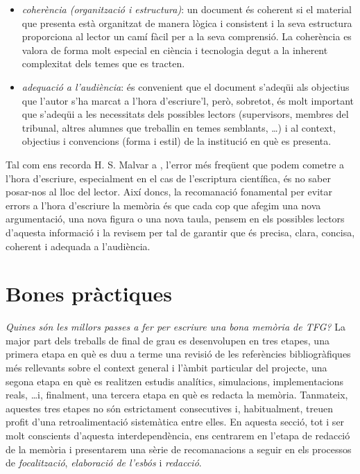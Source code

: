 \begin{itemize}
   \item \emph{coherència (organització i estructura)}: un document és coherent si el material que presenta està organitzat de manera lògica i consistent i la seva estructura proporciona al lector un camí fàcil per a la seva comprensió. La coherència es valora de forma molt especial en ciència i tecnologia degut a la inherent complexitat dels temes que es tracten.


   \item \emph{adequació a l'audiència}: és convenient que el document s'adeqüi als objectius que l'autor s'ha marcat a l'hora d'escriure'l, però, sobretot, és molt important que s'adeqüi a les necessitats dels possibles lectors (supervisors, membres del tribunal, altres alumnes que treballin en temes semblants, \ldots) i al context, objectius i convencions (forma i estil) de la institució en què es presenta.
\end{itemize}

Tal com ens recorda H. S. Malvar a \cite{Malvar08}, l'error més freqüent que podem cometre a l'hora d'escriure, especialment en el cas de l'escriptura científica, és no saber posar-nos al lloc del lector. Així doncs, la recomanació fonamental per evitar errors a l'hora d'escriure la memòria és que cada cop que afegim una nova argumentació, una nova figura o una nova taula, pensem en els possibles lectors d'aquesta informació i la revisem per tal de garantir que és precisa, clara, concisa, coherent i adequada a l'audiència.

\section{Bones pràctiques}

\emph{Quines són les millors passes a fer per escriure una bona memòria de \ac{TFG}?} La major part dels treballs de final de grau es desenvolupen en tres etapes, una primera etapa en què es duu a terme una revisió de les referències bibliogràfiques més rellevants sobre el context general i l'àmbit particular del projecte, una segona etapa en què es realitzen estudis analítics, simulacions, implementacions reals, \ldots i, finalment, una tercera etapa en què es redacta la memòria. Tanmateix, aquestes tres etapes no són estrictament consecutives i, habitualment, treuen profit d'una retroalimentació sistemàtica entre elles. En aquesta secció, tot i ser molt conscients d'aquesta interdependència, ens centrarem en l'etapa de redacció de la memòria i presentarem una sèrie de recomanacions a seguir en els processos de \emph{focalització}, \emph{elaboració de l'esbós} i \emph{redacció}.

